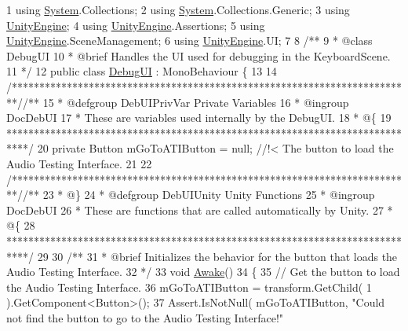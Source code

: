 \begin{DoxyCodeInclude}
1 \textcolor{keyword}{using} \hyperlink{namespace_system}{System}.Collections;
2 \textcolor{keyword}{using} \hyperlink{namespace_system}{System}.Collections.Generic;
3 \textcolor{keyword}{using} \hyperlink{namespace_unity_engine}{UnityEngine};
4 \textcolor{keyword}{using} \hyperlink{namespace_unity_engine}{UnityEngine}.Assertions;
5 \textcolor{keyword}{using} \hyperlink{namespace_unity_engine}{UnityEngine}.SceneManagement;
6 \textcolor{keyword}{using} \hyperlink{namespace_unity_engine}{UnityEngine}.UI;
7 \textcolor{comment}{}
8 \textcolor{comment}{/** }
9 \textcolor{comment}{ * @class DebugUI}
10 \textcolor{comment}{ * @brief Handles the UI used for debugging in the KeyboardScene.}
11 \textcolor{comment}{*/}
12 \textcolor{keyword}{public} \textcolor{keyword}{class }\hyperlink{class_debug_u_i}{DebugUI} : MonoBehaviour \{
13 
14     \textcolor{comment}{/*************************************************************************/}\textcolor{comment}{/** }
15 \textcolor{comment}{    * @defgroup DebUIPrivVar Private Variables}
16 \textcolor{comment}{    * @ingroup DocDebUI}
17 \textcolor{comment}{    * These are variables used internally by the DebugUI.}
18 \textcolor{comment}{    * @\{}
19 \textcolor{comment}{    ****************************************************************************/}
20     \textcolor{keyword}{private} Button mGoToATIButton = null; \textcolor{comment}{//!< The button to load the Audio Testing Interface.}
21 \textcolor{comment}{}
22     \textcolor{comment}{/*************************************************************************/}\textcolor{comment}{/** }
23 \textcolor{comment}{    * @\}}
24 \textcolor{comment}{    * @defgroup DebUIUnity Unity Functions}
25 \textcolor{comment}{    * @ingroup DocDebUI}
26 \textcolor{comment}{    * These are functions that are called automatically by Unity.}
27 \textcolor{comment}{    * @\{}
28 \textcolor{comment}{    ****************************************************************************/}
29 \textcolor{comment}{}
30 \textcolor{comment}{    /**}
31 \textcolor{comment}{     * @brief Initializes the behavior for the button that loads the Audio Testing Interface.}
32 \textcolor{comment}{    */}
33     \textcolor{keywordtype}{void} \hyperlink{group___deb_u_i_unity_ga1369ce8825b055ee93722b2626a06d1e}{Awake}()
34     \{
35         \textcolor{comment}{// Get the button to load the Audio Testing Interface.}
36         mGoToATIButton = transform.GetChild( 1 ).GetComponent<Button>();
37         Assert.IsNotNull( mGoToATIButton, \textcolor{stringliteral}{"Could not find the button to go to the Audio Testing Interface!"}

\end{DoxyCodeInclude}
